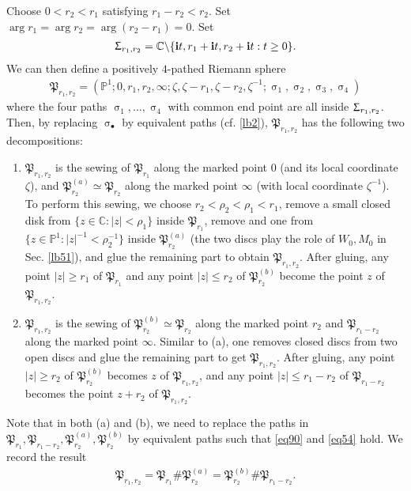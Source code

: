 \documentclass[11pt,b5paper,notitlepage]{article}
\theoremstyle{definition}
\theoremstyle{plain}
\newcommand{\fk}{\mathfrak}
\newcommand{\im}{\mathbf{i}}
\newcommand{\blt}{\bullet}
\newcommand{\Cbb}{\mathbb C}
\newcommand{\Pbb}{\mathbb P}
\numberwithin{equation}{subsection}
\begin{document}
Choose $0<r_2<r_1$ satisfying $r_1-r_2<r_2$. Set $\arg r_1=\arg r_2=\arg(r_2-r_1)=0$. Set
\begin{align*}
\Upsigma_{r_1,r_2}=\Cbb\backslash\{\im t,r_1+\im t,r_2+\im t:t\geq 0\}.	
\end{align*}
We can then define a positively $4$-pathed Riemann sphere
\begin{align*}
\fk P_{r_1,r_2}=(\Pbb^1;0,r_1,r_2,\infty;\zeta,\zeta-r_1,\zeta-r_2,\zeta^{-1};\upsigma_1,\upsigma_2,\upsigma_3,\upsigma_4)	
\end{align*}
where the four paths $\upsigma_1,\dots,\upsigma_4$ with common end point are all inside $\Upsigma_{r_1,r_2}$. Then, by replacing $\upsigma_\blt$ by equivalent paths (cf. \ref{lb2}), $\fk P_{r_1,r_2}$ has the following two decompositions:
\begin{enumerate}[label=(\alph*)]
\item $\fk P_{r_1,r_2}$ is the sewing of  $\fk P_{r_1}$ along the marked point $0$ (and its local coordinate $\zeta$), and $\fk P_{r_2}^{(a)}\simeq\fk P_{r_2}$ along the marked point $\infty$ (with local coordinate $\zeta^{-1}$). To perform this sewing, we choose $r_2<\rho_2<\rho_1<r_1$, remove a small closed disk from $\{z\in\Cbb:|z|<\rho_1\}$ inside $\fk P_{r_1}$, remove and one from $\{z\in\Pbb^1:|z|^{-1}<\rho_2^{-1}\}$ inside $\fk P_{r_2}^{(a)}$ (the two discs play the role of $W_0,M_0$ in Sec. \ref{lb51}), and glue the remaining part to obtain $\fk P_{r_1,r_2}$. After gluing, any point $|z|\geq r_1$ of $\fk P_{r_1}$ and any point $|z|\leq r_2$ of $\fk P_{r_2}^{(b)}$ become the point $z$ of $\fk P_{r_1,r_2}$.

\item $\fk P_{r_1,r_2}$ is the sewing of  $\fk P_{r_2}^{(b)}\simeq\fk P_{r_2}$ along the marked point $r_2$ and $\fk P_{r_1-r_2}$ along the marked point $\infty$. Similar to (a), one removes closed discs from two open discs and glue the remaining part to get $\fk P_{r_1,r_2}$. After gluing, any point $|z|\geq r_2$ of $\fk P^{(b)}_{r_2}$ becomes $z$ of $\fk P_{r_1,r_2}$, and any point $|z|\leq r_1-r_2$ of $\fk P_{r_1-r_2}$ becomes the point $z+r_2$ of $\fk P_{r_1,r_2}$.
\end{enumerate}

Note that in both (a) and (b), we need to replace the paths in $\fk P_{r_1},\fk P_{r_1-r_2},\fk P_{r_2}^{(a)},\fk P_{r_2}^{(b)}$ by equivalent paths such that \eqref{eq90} and \eqref{eq54} hold. We record the result
\begin{align}
\fk P_{r_1,r_2}=\fk P_{r_1}\# \fk P_{r_2}^{(a)}=\fk P_{r_2}^{(b)}\#\fk P_{r_1-r_2}.	\label{eq97}
\end{align}
\end{document}
